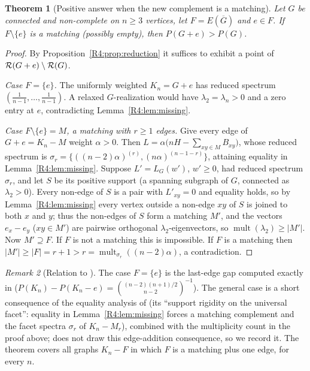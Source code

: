 \documentclass[11pt]{amsart}
\newtheorem{theorem}{Theorem}[section]
\theoremstyle{definition}
\theoremstyle{remark}
\newtheorem{remark}[theorem]{Remark}
\begin{document}
\begin{theorem}[Positive answer when the new complement is a matching]
\label{R4:thm:matching}
Let $G$ be connected and non-complete on $n\ge3$ vertices, let
$F=E(\overline G)$ and $e\in F$.  If $F\setminus\{e\}$ is a matching
(possibly empty), then $P(G+e)>P(G)$.
\end{theorem}

\begin{proof}
By Proposition~\ref{R4:prop:reduction} it suffices to exhibit a point of
$\mathcal{R}(G+e)\setminus\mathcal{R}(G)$.

\emph{Case $F=\{e\}$.} The uniformly weighted $K_n=G+e$ has reduced
spectrum $(\frac1{n-1},\dots,\frac1{n-1})$.  A relaxed $G$-realization
would have $\lambda_2=\lambda_n>0$ and a zero entry at $e$, contradicting
Lemma~\ref{R4:lem:missing}.

\emph{Case $F\setminus\{e\}=M$, a matching with $r\ge1$ edges.} Give every
edge of $G+e=K_n-M$ weight $\alpha>0$.  Then
$L=\alpha\bigl(nH-\sum_{xy\in M}B_{xy}\bigr)$, whose reduced spectrum is
$\sigma_r=\{((n-2)\alpha)^{(r)},(n\alpha)^{(n-1-r)}\}$, attaining equality
in Lemma~\ref{R4:lem:missing}.  Suppose $L'=L_G(w')$, $w'\ge0$, had reduced
spectrum $\sigma_r$, and let $S$ be its positive support (a spanning
subgraph of $G$, connected as $\lambda_2>0$).  Every non-edge of $S$ is a
pair with $L'_{xy}=0$ and equality holds, so by Lemma~\ref{R4:lem:missing}
every vertex outside a non-edge $xy$ of $S$ is joined to both $x$ and $y$;
thus the non-edges of $S$ form a matching $M'$, and the vectors
$e_x-e_y$ ($xy\in M'$) are pairwise orthogonal $\lambda_2$-eigenvectors, so
$\operatorname{mult}(\lambda_2)\ge|M'|$.  Now $M'\supseteq F$.  If $F$ is not a
matching this is impossible.  If $F$ is a matching then
$|M'|\ge|F|=r+1>r=\operatorname{mult}_{\sigma_r}((n-2)\alpha)$, a
contradiction.
\end{proof}

\begin{remark}[Relation to {\cite{K-015}}]
The case $F=\{e\}$ is the last-edge gap computed exactly in
\cite{K-015} ($P(K_n)-P(K_n-e)=\binom{(n-2)(n+1)/2}{n-2}^{-1}$).  The
general case is a short consequence of the equality analysis of
\cite{K-015} (its ``support rigidity on the universal facet'': equality in
Lemma~\ref{R4:lem:missing} forces a matching complement and the facet
spectra $\sigma_r$ of $K_n-M_r$), combined with the multiplicity count in
the proof above; \cite{K-015} does not draw this edge-addition
consequence, so we record it.  The theorem covers all graphs $K_n-F$ in
which $F$ is a matching plus one edge, for every $n$.
\end{remark}
\end{document}
